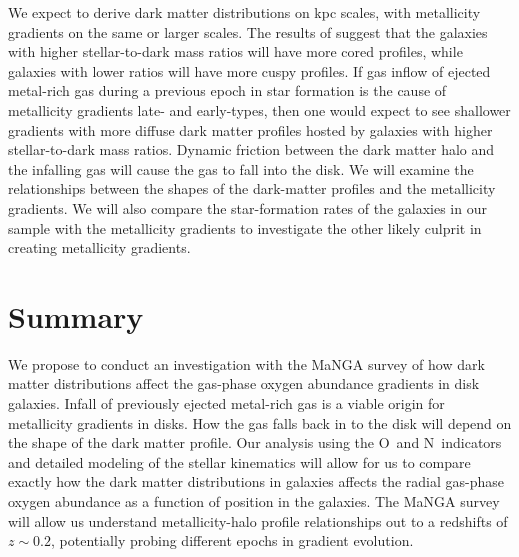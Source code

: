 \documentclass[11pt, a4paper, onecolumn]{article}
\begin{document}
\begin{multicols}{2}
    We expect to derive dark matter distributions on kpc scales, with
    metallicity gradients on the same or larger scales. The results of
    \citet{dicintio14,dicintio14b} suggest that the galaxies with higher
    stellar-to-dark mass ratios will have more cored profiles, while galaxies
    with lower ratios will have more cuspy profiles. If gas inflow of ejected
    metal-rich gas during a previous epoch in star formation is the cause of
    metallicity gradients late- and early-types, then one would expect to see
    shallower gradients with more diffuse dark matter profiles hosted by
    galaxies with higher stellar-to-dark mass ratios. Dynamic friction between
    the dark matter halo and the infalling gas will cause the gas to fall into
    the disk. We will examine the relationships between the shapes of the
    dark-matter profiles and the metallicity gradients. We will also compare
    the star-formation rates of the galaxies in our sample with the metallicity
    gradients to investigate the other likely culprit in creating metallicity
    gradients.

\section{Summary}

    We propose to conduct an investigation with the MaNGA survey of how dark
    matter distributions affect the gas-phase oxygen abundance gradients in
    disk galaxies. Infall of previously ejected metal-rich gas is a viable
    origin for metallicity gradients in disks. How the gas falls back in to the
    disk will depend on the shape of the dark matter profile. Our analysis
    using the O\iii\ and N\ii\ indicators and detailed modeling of the stellar
    kinematics will allow for us to compare exactly how the dark matter
    distributions in galaxies affects the radial gas-phase oxygen abundance as
    a function of position in the galaxies. The MaNGA survey will allow us
    understand metallicity-halo profile relationships out to a redshifts of $z
    \sim 0.2$, potentially probing different epochs in gradient evolution.

    
    
\end{multicols}
\end{document}
